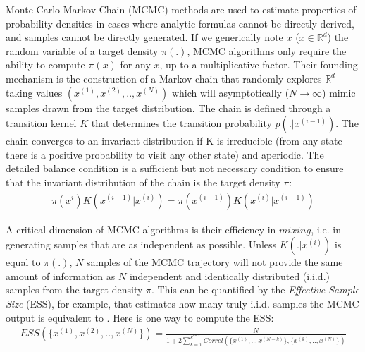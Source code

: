 \documentclass[a4paper,11pt,titlepage]{article}
\theoremstyle{plain} %
\begin{document}
Monte Carlo Markov Chain (MCMC) methods are used to estimate properties of probability densities in cases where analytic formulas cannot be directly derived, and samples cannot be directly generated. If we generically note $x$ ($x\in\mathbb{R}^d$) the  random variable of a target density  $\pi(.)$, MCMC algorithms only require the ability to compute $\pi(x)$ for any $x$, up to a multiplicative factor. Their founding mechanism is the construction of a Markov chain that randomly explores $\mathbb{R}^d$ taking values $(x^{(1)},x^{(2)},..,x^{(N)})$ which will asymptotically ($N\rightarrow\infty$) mimic samples drawn from the target distribution. The chain is defined through a transition kernel $K$ that determines the transition probability $p(.|x^{(i-1)})$. The chain converges to an invariant distribution if K is irreducible (from any state there is a positive probability to visit any other state) and aperiodic. The detailed balance condition is a sufficient but not necessary condition to ensure that the invariant distribution of the chain is the target density $\pi$:
\begin{align}
	\pi(x^i)K(x^{(i-1)}|x^{(i)}) = \pi(x^{(i-1)})K(x^{(i)}|x^{(i-1)})
\end{align}


A critical dimension of MCMC algorithms is their efficiency in $mixing$, i.e. in generating samples that are  as independent as possible. Unless $K(.|x^{(i)})$ is equal to  $\pi(.)$, $N$ samples of the MCMC trajectory will not provide the same amount of information as $N$ independent and identically distributed (i.i.d.) samples from the target density $\pi$. This can be quantified by the \emph{Effective Sample Size} (ESS), for example, that estimates how many truly i.i.d. samples the MCMC  output is equivalent to \citep{Geyer1992, Brooks1998}. Here is one way to compute the ESS:
\begin{align}
	ESS(\{x^{(1)},x^{(2)},..,x^{(N)}\}) = \frac{N}{1+2\sum_{k=1}^{k^{max}}Correl(\{x^{(1)},..,x^{(N-k)}\},\{x^{(k)},..,x^{(N)}\})}
\end{align}
\end{document}
